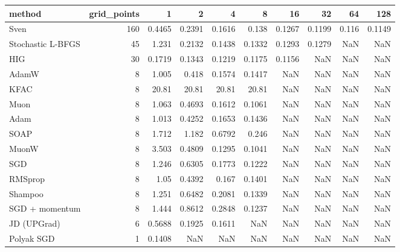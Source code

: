 \begin{tabular}{lrrrrrrrrr}
\toprule
method & grid\_points & 1 & 2 & 4 & 8 & 16 & 32 & 64 & 128 \\
\midrule
Sven & 160 & 0.4465 & 0.2391 & 0.1616 & 0.138 & 0.1267 & 0.1199 & 0.116 & 0.1149 \\
Stochastic L-BFGS & 45 & 1.231 & 0.2132 & 0.1438 & 0.1332 & 0.1293 & 0.1279 & NaN & NaN \\
HIG & 30 & 0.1719 & 0.1343 & 0.1219 & 0.1175 & 0.1156 & NaN & NaN & NaN \\
AdamW & 8 & 1.005 & 0.418 & 0.1574 & 0.1417 & NaN & NaN & NaN & NaN \\
KFAC & 8 & 20.81 & 20.81 & 20.81 & 20.81 & NaN & NaN & NaN & NaN \\
Muon & 8 & 1.063 & 0.4693 & 0.1612 & 0.1061 & NaN & NaN & NaN & NaN \\
Adam & 8 & 1.013 & 0.4252 & 0.1653 & 0.1436 & NaN & NaN & NaN & NaN \\
SOAP & 8 & 1.712 & 1.182 & 0.6792 & 0.246 & NaN & NaN & NaN & NaN \\
MuonW & 8 & 3.503 & 0.4809 & 0.1295 & 0.1041 & NaN & NaN & NaN & NaN \\
SGD & 8 & 1.246 & 0.6305 & 0.1773 & 0.1222 & NaN & NaN & NaN & NaN \\
RMSprop & 8 & 1.05 & 0.4392 & 0.167 & 0.1401 & NaN & NaN & NaN & NaN \\
Shampoo & 8 & 1.251 & 0.6482 & 0.2081 & 0.1339 & NaN & NaN & NaN & NaN \\
SGD + momentum & 8 & 1.444 & 0.8612 & 0.2848 & 0.1237 & NaN & NaN & NaN & NaN \\
JD (UPGrad) & 6 & 0.5688 & 0.1925 & 0.1611 & NaN & NaN & NaN & NaN & NaN \\
Polyak SGD & 1 & 0.1408 & NaN & NaN & NaN & NaN & NaN & NaN & NaN \\
\bottomrule
\end{tabular}
